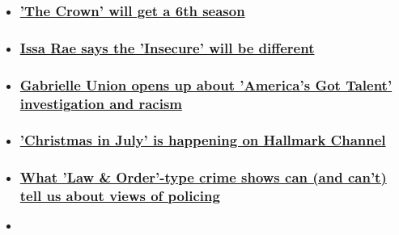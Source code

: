 \begin{itemize}
\item
  \hypertarget{the-crown-will-get-a-6th-season}{%
  \subsubsection{\texorpdfstring{\href{/2020/07/09/entertainment/the-crown-season-6/index.html}{'The
  Crown' will get a 6th
  season}}{'The Crown' will get a 6th season}}\label{the-crown-will-get-a-6th-season}}
\item
  \hypertarget{issa-rae-says-the-insecure-will-be-different}{%
  \subsubsection{\texorpdfstring{\href{/2020/06/13/entertainment/issa-rae-insecure-season-finale/index.html}{Issa
  Rae says the 'Insecure' will be
  different}}{Issa Rae says the 'Insecure' will be different}}\label{issa-rae-says-the-insecure-will-be-different}}
\item
  \hypertarget{gabrielle-union-opens-up-about-americas-got-talent-investigation-and-racism}{%
  \subsubsection{\texorpdfstring{\href{/2020/06/18/entertainment/gabrielle-union-agt-investigation-racism/index.html}{Gabrielle
  Union opens up about 'America's Got Talent' investigation and
  racism}}{Gabrielle Union opens up about 'America's Got Talent' investigation and racism}}\label{gabrielle-union-opens-up-about-americas-got-talent-investigation-and-racism}}
\item
  \hypertarget{christmas-in-july-is-happening-on-hallmark-channel}{%
  \subsubsection{\texorpdfstring{\href{/2020/06/18/entertainment/christmas-july-hallmark-trnd/index.html}{'Christmas
  in July' is happening on Hallmark
  Channel}}{'Christmas in July' is happening on Hallmark Channel}}\label{christmas-in-july-is-happening-on-hallmark-channel}}
\item
  \hypertarget{what-law--order-type-crime-shows-can-and-cant-tell-us-about-views-of-policing}{%
  \subsubsection{\texorpdfstring{\href{/2020/06/04/entertainment/law--order-column/index.html}{What
  'Law \& Order'-type crime shows can (and can't) tell us about views of
  policing}}{What 'Law \& Order'-type crime shows can (and can't) tell us about views of policing}}\label{what-law--order-type-crime-shows-can-and-cant-tell-us-about-views-of-policing}}
\item
  \hypertarget{the-betty-broderick-story-gets-a-fresh-look-from-dirty-john-miniseries}{%
}
\end{itemize}
